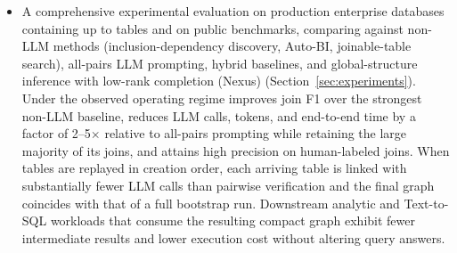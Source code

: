 \begin{itemize}[leftmargin=*]
\item A comprehensive experimental evaluation on  production enterprise databases containing up to  tables and on public benchmarks, comparing against non-LLM methods (inclusion-dependency discovery, Auto-BI, joinable-table search), all-pairs LLM prompting, hybrid baselines, and global-structure inference with low-rank completion (Nexus) (Section~\ref{sec:experiments}). Under the observed operating regime \ourmethod improves join F1 over the strongest non-LLM baseline, reduces LLM calls, tokens, and end-to-end time by a factor of 2--5$\times$ relative to all-pairs prompting while retaining the large majority of its joins, and attains high precision on human-labeled joins. When tables are replayed in creation order, each arriving table is linked with substantially fewer LLM calls than pairwise verification and the final graph coincides with that of a full bootstrap run. Downstream analytic and Text-to-SQL workloads that consume the resulting compact graph exhibit fewer intermediate results and lower execution cost without altering query answers.
\end{itemize}

